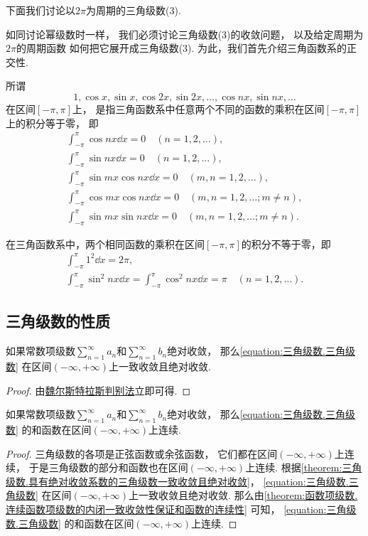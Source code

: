 下面我们讨论以\(2\pi\)为周期的三角级数(3).

如同讨论幂级数时一样，
我们必须讨论三角级数(3)的收敛问题，
以及给定周期为\(2\pi\)的周期函数%
如何把它展开成三角级数(3).
为此，我们首先介绍三角函数系的正交性.

\begin{definition}
所谓\[
1, \cos x, \sin x, \cos 2x, \sin 2x, \dotsc, \cos nx, \sin nx, \dotsc
\]在区间\([-\pi,\pi]\)上，
是指三角函数系中任意两个不同的函数的乘积在区间\([-\pi,\pi]\)上的积分等于零，
即\begin{gather*}
	\int_{-\pi}^\pi \cos{nx} \dd{x} = 0 \quad(n=1,2,\dotsc), \\
	\int_{-\pi}^\pi \sin{nx} \dd{x} = 0 \quad(n=1,2,\dotsc), \\
	\int_{-\pi}^\pi \sin{mx}\cos{nx} \dd{x} = 0 \quad(m,n=1,2,\dotsc), \\
	\int_{-\pi}^\pi \cos{mx}\cos{nx} \dd{x} = 0 \quad(m,n=1,2,\dotsc; m \neq n), \\
	\int_{-\pi}^\pi \sin{mx}\sin{nx} \dd{x} = 0 \quad(m,n=1,2,\dotsc; m \neq n).
\end{gather*}

在三角函数系中，两个相同函数的乘积在区间\([-\pi,\pi]\)的积分不等于零，即
\begin{gather*}
\int_{-\pi}^\pi 1^2 \dd{x} = 2\pi, \\
\int_{-\pi}^\pi \sin^2 nx \dd{x} = \int_{-\pi}^\pi \cos^2 nx \dd{x} = \pi \quad(n=1,2,\dotsc).
\end{gather*}
\end{definition}

\subsection{三角级数的性质}
\begin{property}\label{theorem:三角级数.具有绝对收敛系数的三角级数一致收敛且绝对收敛}
如果常数项级数\(\sum_{n=1}^\infty a_n\)和\(\sum_{n=1}^\infty b_n\)绝对收敛，
那么\cref{equation:三角级数.三角级数} 在区间\((-\infty,+\infty)\)上一致收敛且绝对收敛.
\begin{proof}
由\hyperref[theorem:无穷级数.魏尔斯特拉斯判别法]{魏尔斯特拉斯判别法}立即可得.
\end{proof}
\end{property}

\begin{property}
如果常数项级数\(\sum_{n=1}^\infty a_n\)和\(\sum_{n=1}^\infty b_n\)绝对收敛，
那么\cref{equation:三角级数.三角级数} 的和函数在区间\((-\infty,+\infty)\)上连续.
\begin{proof}
三角级数的各项是正弦函数或余弦函数，
它们都在区间\((-\infty,+\infty)\)上连续，
于是三角级数的部分和函数也在区间\((-\infty,+\infty)\)上连续.
根据\cref{theorem:三角级数.具有绝对收敛系数的三角级数一致收敛且绝对收敛}，
\cref{equation:三角级数.三角级数} 在区间\((-\infty,+\infty)\)上一致收敛且绝对收敛.
那么由\cref{theorem:函数项级数.连续函数项级数的内闭一致收敛性保证和函数的连续性} 可知，
\cref{equation:三角级数.三角级数} 的和函数在区间\((-\infty,+\infty)\)上连续.
\end{proof}
\end{property}


